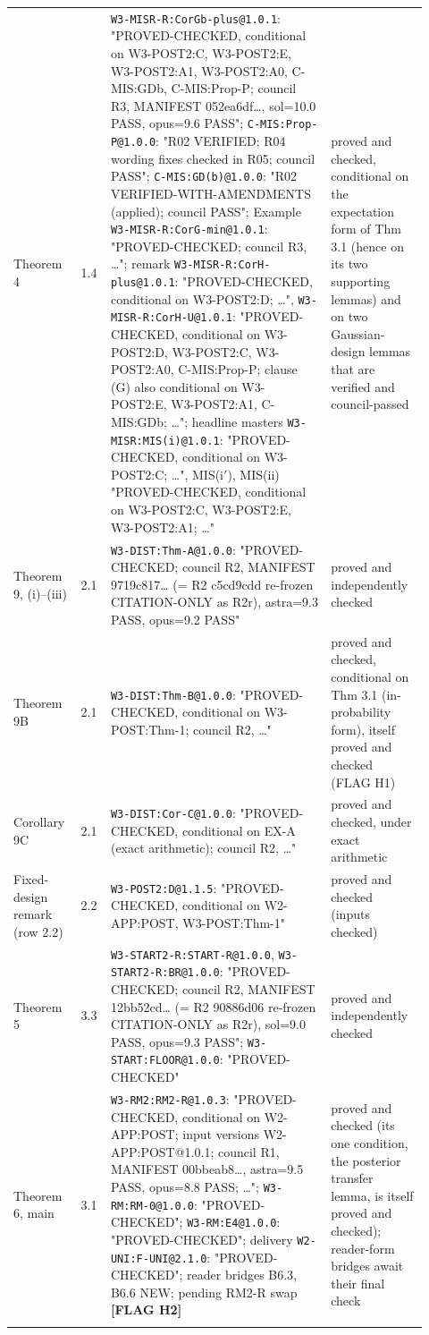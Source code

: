 \begin{longtable}{@{}p{0.15\linewidth}p{0.05\linewidth}p{0.5\linewidth}p{0.22\linewidth}@{}}
Theorem 4 & 1.4 & \texttt{W3-MISR-R:CorGb-plus@1.0.1}: "PROVED-CHECKED, conditional on W3-POST2:C, W3-POST2:E, W3-POST2:A1, W3-POST2:A0, C-MIS:GDb, C-MIS:Prop-P; council R3, MANIFEST 052ea6df\ldots{}, sol=10.0 PASS, opus=9.6 PASS"; \texttt{C-MIS:Prop-P@1.0.0}: "R02 VERIFIED; R04 wording fixes checked in R05; council PASS"; \texttt{C-MIS:GD(b)@1.0.0}: "R02 VERIFIED-WITH-AMENDMENTS (applied); council PASS"; Example \texttt{W3-MISR-R:CorG-min@1.0.1}: "PROVED-CHECKED; council R3, \ldots{}"; remark \texttt{W3-MISR-R:CorH-plus@1.0.1}: "PROVED-CHECKED, conditional on W3-POST2:D; \ldots{}", \texttt{W3-MISR-R:CorH-U@1.0.1}: "PROVED-CHECKED, conditional on W3-POST2:D, W3-POST2:C, W3-POST2:A0, C-MIS:Prop-P; clause (G) also conditional on W3-POST2:E, W3-POST2:A1, C-MIS:GDb; \ldots{}"; headline masters \texttt{W3-MISR:MIS(i)@1.0.1}: "PROVED-CHECKED, conditional on W3-POST2:C; \ldots{}", MIS(i$'$), MIS(ii) "PROVED-CHECKED, conditional on W3-POST2:C, W3-POST2:E, W3-POST2:A1; \ldots{}" & proved and checked, conditional on the expectation form of Thm 3.1 (hence on its two supporting lemmas) and on two Gaussian-design lemmas that are verified and council-passed \\ \addlinespace
Theorem 9, (i)--(iii) & 2.1 & \texttt{W3-DIST:Thm-A@1.0.0}: "PROVED-CHECKED; council R2, MANIFEST 9719c817\ldots{} (= R2 c5cd9cdd re-frozen CITATION-ONLY as R2r), astra=9.3 PASS, opus=9.2 PASS" & proved and independently checked \\ \addlinespace
Theorem 9B & 2.1 & \texttt{W3-DIST:Thm-B@1.0.0}: "PROVED-CHECKED, conditional on W3-POST:Thm-1; council R2, \ldots{}" & proved and checked, conditional on Thm 3.1 (in-probability form), itself proved and checked (FLAG H1) \\ \addlinespace
Corollary 9C & 2.1 & \texttt{W3-DIST:Cor-C@1.0.0}: "PROVED-CHECKED, conditional on EX-A (exact arithmetic); council R2, \ldots{}" & proved and checked, under exact arithmetic \\ \addlinespace
Fixed-design remark (row 2.2) & 2.2 & \texttt{W3-POST2:D@1.1.5}: "PROVED-CHECKED, conditional on W2-APP:POST, W3-POST:Thm-1" & proved and checked (inputs checked) \\ \addlinespace
Theorem 5 & 3.3 & \texttt{W3-START2-R:START-R@1.0.0}, \texttt{W3-START2-R:BR@1.0.0}: "PROVED-CHECKED; council R2, MANIFEST 12bb52cd\ldots{} (= R2 90886d06 re-frozen CITATION-ONLY as R2r), sol=9.0 PASS, opus=9.3 PASS"; \texttt{W3-START:FLOOR@1.0.0}: "PROVED-CHECKED" & proved and independently checked \\ \addlinespace
Theorem 6, main & 3.1 & \texttt{W3-RM2:RM2-R@1.0.3}: "PROVED-CHECKED, conditional on W2-APP:POST; input versions W2-APP:POST@1.0.1; council R1, MANIFEST 00bbeab8\ldots{}, astra=9.5 PASS, opus=8.8 PASS; \ldots{}"; \texttt{W3-RM:RM-0@1.0.0}: "PROVED-CHECKED"; \texttt{W3-RM:E4@1.0.0}: "PROVED-CHECKED"; delivery \texttt{W2-UNI:F-UNI@2.1.0}: "PROVED-CHECKED"; reader bridges B6.3, B6.6 NEW; pending RM2-R swap \textbf{[FLAG H2]} & proved and checked (its one condition, the posterior transfer lemma, is itself proved and checked); reader-form bridges await their final check \\ \addlinespace

\end{longtable}
